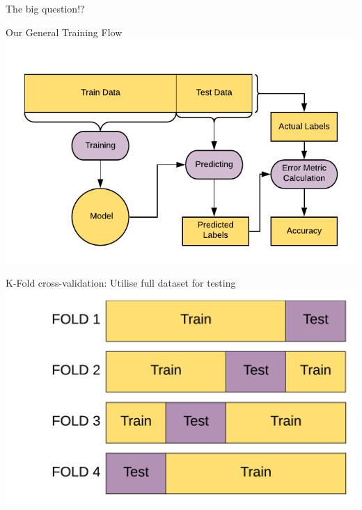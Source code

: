\documentclass{beamer}
\begin{document}
\begin{frame}{The big question!?}
\end{frame}


\begin{frame}{Our General Training Flow}
\includegraphics[width = \textwidth]{../bias-variance/imgs/general-workflow}
\end{frame}

\begin{frame}{K-Fold cross-validation: Utilise full dataset for testing}
\includegraphics[width = \textwidth]{cross-validation-train-test.pdf}
\end{frame}
\end{document}
